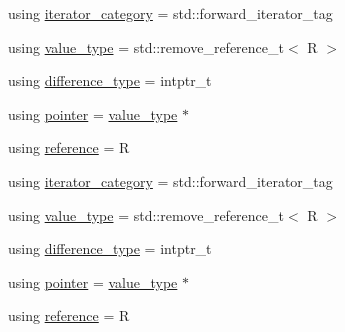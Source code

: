 \begin{DoxyCompactItemize}
\item 
using \mbox{\hyperlink{structrah_1_1iterator__facade_3_01_i_00_01_r_00_01std_1_1output__iterator__tag_01_4_aea9805a7e6e6fa707e827522d25a2c62}{iterator\+\_\+category}} = std\+::forward\+\_\+iterator\+\_\+tag
\item 
using \mbox{\hyperlink{structrah_1_1iterator__facade_3_01_i_00_01_r_00_01std_1_1output__iterator__tag_01_4_aeafcf4359545a589d72a23f8500e9b74}{value\+\_\+type}} = std\+::remove\+\_\+reference\+\_\+t$<$ R $>$
\item 
using \mbox{\hyperlink{structrah_1_1iterator__facade_3_01_i_00_01_r_00_01std_1_1output__iterator__tag_01_4_a98026d696f26da59a6b8a2bc85a4e8d1}{difference\+\_\+type}} = intptr\+\_\+t
\item 
using \mbox{\hyperlink{structrah_1_1iterator__facade_3_01_i_00_01_r_00_01std_1_1output__iterator__tag_01_4_a7d1e657a8d01cc9f8adca5477b017ccb}{pointer}} = \mbox{\hyperlink{structrah_1_1iterator__facade_3_01_i_00_01_r_00_01std_1_1output__iterator__tag_01_4_aeafcf4359545a589d72a23f8500e9b74}{value\+\_\+type}} $\ast$
\item 
using \mbox{\hyperlink{structrah_1_1iterator__facade_3_01_i_00_01_r_00_01std_1_1output__iterator__tag_01_4_aa6a95e1b55444933973b7fe4a63512e2}{reference}} = R
\item 
using \mbox{\hyperlink{structrah_1_1iterator__facade_3_01_i_00_01_r_00_01std_1_1output__iterator__tag_01_4_aea9805a7e6e6fa707e827522d25a2c62}{iterator\+\_\+category}} = std\+::forward\+\_\+iterator\+\_\+tag
\item 
using \mbox{\hyperlink{structrah_1_1iterator__facade_3_01_i_00_01_r_00_01std_1_1output__iterator__tag_01_4_aeafcf4359545a589d72a23f8500e9b74}{value\+\_\+type}} = std\+::remove\+\_\+reference\+\_\+t$<$ R $>$
\item 
using \mbox{\hyperlink{structrah_1_1iterator__facade_3_01_i_00_01_r_00_01std_1_1output__iterator__tag_01_4_a98026d696f26da59a6b8a2bc85a4e8d1}{difference\+\_\+type}} = intptr\+\_\+t
\item 
using \mbox{\hyperlink{structrah_1_1iterator__facade_3_01_i_00_01_r_00_01std_1_1output__iterator__tag_01_4_a7d1e657a8d01cc9f8adca5477b017ccb}{pointer}} = \mbox{\hyperlink{structrah_1_1iterator__facade_3_01_i_00_01_r_00_01std_1_1output__iterator__tag_01_4_aeafcf4359545a589d72a23f8500e9b74}{value\+\_\+type}} $\ast$
\item 
using \mbox{\hyperlink{structrah_1_1iterator__facade_3_01_i_00_01_r_00_01std_1_1output__iterator__tag_01_4_aa6a95e1b55444933973b7fe4a63512e2}{reference}} = R
\end{DoxyCompactItemize}
